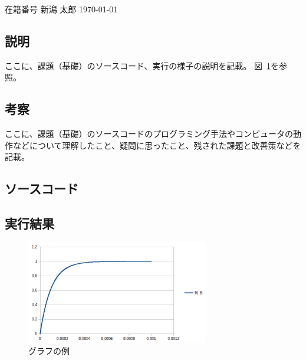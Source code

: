 \documentclass[a4paper,12pt,uplatex]{jsarticle}
\newcommand{\mynumber}{在籍番号} %
\newcommand{\myname}{新潟 太郎} %
\newcommand{\myheader}{ %

\begin{flushright}
\mynumber\hspace{1zw} \myname\hspace{1zw} \today\end{flushright}}
\begin{document}
\myheader

\subsection*{説明}

ここに、課題（基礎）のソースコード、実行の様子の説明を記載。
図~\ref{graph}を参照。

\subsection*{考察}

ここに、課題（基礎）のソースコードのプログラミング手法やコンピュータの動作などについて理解したこと、疑問に思ったこと、残された課題と改善策などを記載。

\subsection*{ソースコード}

% 

\subsection*{実行結果}

\begin{figure}[h]
\centering
\includegraphics[width=80mm]{graph.png}
\caption{グラフの例}\label{graph}
\end{figure}


\end{document}
